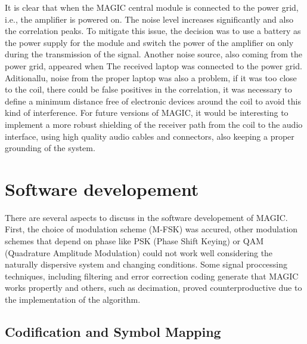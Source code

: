 It is clear that when the MAGIC central module is connected to the power grid, i.e., the amplifier is powered on. The noise level increases significantly and also the correlation peaks.
\newp
To mitigate this issue, the decision was to use a battery as the power supply for the module and switch the power of the amplifier on only during the transmission of the signal.
\newp
Another noise source, also coming from the power grid, appeared when The received laptop was connected to the power grid. Aditionallu, noise from the proper laptop was also a problem, if it was too close to the coil, there could be false positives in the correlation, it was necessary to define a minimum distance free of electronic devices around the coil to avoid this kind of interference. For future versions of MAGIC, it would be interesting to implement a more robust shielding of the receiver path from the coil to the audio interface, using high quality audio cables and connectors, also keeping a proper grounding of the system.

 


\section{Software developement}

There are several aspects to discuss in the software developement of MAGIC. First, the choice of modulation scheme (M-FSK) was accured, other modulation schemes that depend on phase like PSK (Phase Shift Keying) or QAM (Quadrature Amplitude Modulation) could not work well considering the naturally dispersive system and changing conditions. Some signal proccessing techniques, including filtering and error correction coding generate that MAGIC works propertly and others, such as decimation, proved counterproductive due to the implementation of the algorithm.

\subsection{Codification and Symbol Mapping}

